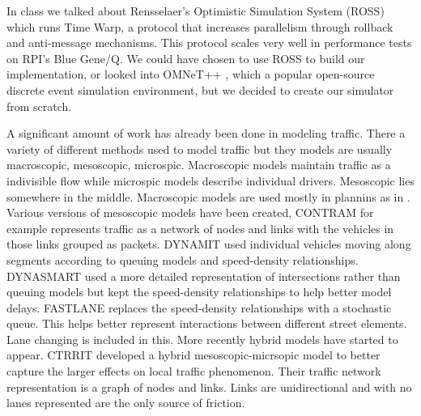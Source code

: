 \documentclass[10pt,a4paper]{article}
\begin{document}
In class we talked about Rensselaer’s Optimistic Simulation System (ROSS) \cite{Barnes:2013:WSE:2486092.2486134} which runs Time Warp, a protocol that increases parallelism through rollback and anti-message mechanisms. This protocol scales very well in performance tests on RPI's Blue Gene/Q. We could have chosen to use ROSS to build our implementation, or looked into OMNeT++ \cite{Varga:2008:OOS:1416222.1416290}, which a popular open-source discrete event simulation environment, but we decided to create our simulator from scratch. 

A significant amount of work has already been done in modeling traffic. There a variety of different methods used to model traffic but they models are usually macroscopic, mesoscopic, microspic. Macroscopic models maintain traffic as a indivisible flow while microspic models describe individual drivers. Mesoscopic lies somewhere in the middle. Macroscopic models are used mostly in plannins as in \cite{Salem:1994}. Various versions of mesoscopic models have been created, CONTRAM \cite{CONTRAM:1989} for example represents traffic as a network of nodes and links with the vehicles in those links grouped as packets. DYNAMIT \cite{Ben-AKiva:2001} used individual vehicles moving along segments according to queuing models and speed-density relationships. DYNASMART \cite{Jayakrishnan:1994} used a more detailed representation of intersections rather than queuing models but kept the speed-density relationships to help better model delays. FASTLANE \cite{Gawron:1998} replaces the speed-density relationships with a stochastic queue. This helps better represent interactions between different street elements. Lane changing is included in this. More recently hybrid models \cite{Burghout:2005} have started to appear. CTRRIT \cite{Burghout:2006} developed a hybrid mesoscopic-micrsopic model to better capture the larger effects on local traffic phenomenon. Their traffic network representation is a graph of nodes and links. Links are unidirectional and with no lanes represented are the only source of friction.
\end{document}
